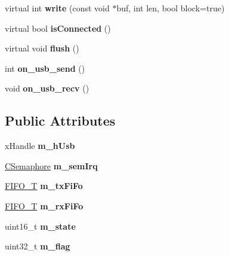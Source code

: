 \begin{DoxyCompactItemize}
\item 
\hypertarget{classusb_c_d_c_a340c728ca722a61a3a457a546a301dec}{virtual int {\bfseries write} (const void $\ast$buf, int len, bool block=true)}\label{classusb_c_d_c_a340c728ca722a61a3a457a546a301dec}

\item 
\hypertarget{classusb_c_d_c_a0c0cb27d108bed8763e68a4121efee32}{virtual bool {\bfseries is\-Connected} ()}\label{classusb_c_d_c_a0c0cb27d108bed8763e68a4121efee32}

\item 
\hypertarget{classusb_c_d_c_afebca0ce341d46537cc6e2a811bede72}{virtual void {\bfseries flush} ()}\label{classusb_c_d_c_afebca0ce341d46537cc6e2a811bede72}

\item 
\hypertarget{classusb_c_d_c_abbbc7fbe6d45daa397f1fe796ce28d97}{int {\bfseries on\-\_\-usb\-\_\-send} ()}\label{classusb_c_d_c_abbbc7fbe6d45daa397f1fe796ce28d97}

\item 
\hypertarget{classusb_c_d_c_a7b1bd30708c95c47753461f865439cbb}{void {\bfseries on\-\_\-usb\-\_\-recv} ()}\label{classusb_c_d_c_a7b1bd30708c95c47753461f865439cbb}

\end{DoxyCompactItemize}
\subsection*{Public Attributes}
\begin{DoxyCompactItemize}
\item 
\hypertarget{classusb_c_d_c_a8af7c1d1489eaa3fa35d140c1fb3e36b}{x\-Handle {\bfseries m\-\_\-h\-Usb}}\label{classusb_c_d_c_a8af7c1d1489eaa3fa35d140c1fb3e36b}

\item 
\hypertarget{classusb_c_d_c_a9904020c60c4f19f92d12f539293dd1f}{\hyperlink{class_c_semaphore}{C\-Semaphore} {\bfseries m\-\_\-sem\-Irq}}\label{classusb_c_d_c_a9904020c60c4f19f92d12f539293dd1f}

\item 
\hypertarget{classusb_c_d_c_acc8bfa27e6d3005950ccce1493de8f7b}{\hyperlink{structfifo__t}{F\-I\-F\-O\-\_\-\-T} {\bfseries m\-\_\-tx\-Fi\-Fo}}\label{classusb_c_d_c_acc8bfa27e6d3005950ccce1493de8f7b}

\item 
\hypertarget{classusb_c_d_c_abded5563b5ed9b2b05773e2756b4b147}{\hyperlink{structfifo__t}{F\-I\-F\-O\-\_\-\-T} {\bfseries m\-\_\-rx\-Fi\-Fo}}\label{classusb_c_d_c_abded5563b5ed9b2b05773e2756b4b147}

\item 
\hypertarget{classusb_c_d_c_ae4f03edf64316170547608292d2d4c0e}{uint16\-\_\-t {\bfseries m\-\_\-state}}\label{classusb_c_d_c_ae4f03edf64316170547608292d2d4c0e}

\item 
\hypertarget{classusb_c_d_c_a65b3a5365936dd08f69243e9d433d132}{uint32\-\_\-t {\bfseries m\-\_\-flag}}\label{classusb_c_d_c_a65b3a5365936dd08f69243e9d433d132}

\end{DoxyCompactItemize}
